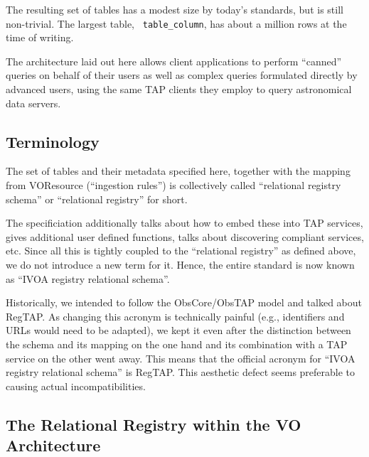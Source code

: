 \documentclass[11pt,a4paper]{ivoa}
\newcommand{\rtent}[1]{\texttt{\color{rtcolor} #1}}
\begin{document}
The resulting set of tables has a modest size by today's standards,
but is still non-trivial.  The largest table, \rtent{table\_column},
has about a million rows at the time of writing.

The architecture laid out here allows client applications to perform ``canned''
queries on behalf of their users as well as complex queries formulated
directly by advanced users, using the same TAP clients they employ to
query astronomical data servers.


\subsection{Terminology}

\label{terms}

The set of tables and their metadata specified here, together with
the mapping from VOResource (``ingestion rules'') is collectively
called ``relational registry schema'' or ``relational registry'' for
short.

The specificiation additionally talks about how to embed these into TAP
services, gives additional user defined functions, talks about
discovering compliant services, etc.  Since all this is tightly coupled
to the ``relational registry'' as defined above, we do not 
introduce a new term for it.  Hence, the entire standard is now known as
``IVOA registry relational schema''.

Historically, we intended to follow the ObsCore/ObsTAP model and
talked about RegTAP.  As changing this acronym is technically painful
(e.g., identifiers and URLs would need to be adapted), we kept it even after
the distinction between the schema and its mapping on the one hand and
its combination with a TAP service on the other went away.  This
means that the official acronym for ``IVOA registry relational schema'' is
RegTAP.  This aesthetic defect seems preferable to causing actual
incompatibilities.


\subsection{The Relational Registry within the VO Architecture}

\label{rolewithinivoa}
\end{document}
